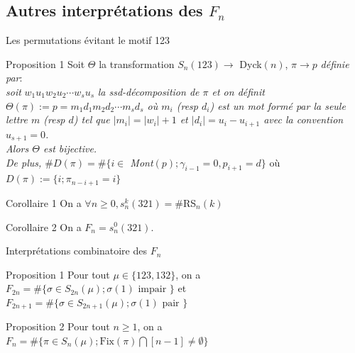 \subsection{Autres interprétations des $F_{n}$}
\begin{frame}{Les permutations évitant le motif 123}
    \transfade
    \begin{block}{Proposition 1}
        Soit $\Theta$ la transformation $S_{n}(123) \longrightarrow$ \rm{Dyck}$(n)$, $\pi \longrightarrow p$ \textit{définie par}:\\
        \textit{soit} $w_{1}u_{1}w_{2}u_2 \cdots w_{s}u_{s}$ \textit{la ssd-décomposition de $\pi$ et on définit $\Theta(\pi):=p=m_{1}d_{1}m_{2}d_{2}\cdots m_{s}d_{s}$ où $m_{i}$ (resp $d_{i}$) est un mot formé par la seule lettre $m$ (resp $d$) tel que $|m_{i}| = |w_{i}|+1$ et $|d_{i}| = u_{i}-u_{i+1}$ avec la convention $u_{s+1}=0$.}\\
        \textit{Alors $\Theta$ est bijective.}\\
        \textit{De plus, $\#D(\pi) = \#\{i\in$ \rm{Mont}$(p)$$;\gamma_{i-1}=0, p_{i+1}=d\}$} où $D(\pi):=\{i; \pi_{n-i+1}=i\}$
    \end{block}
    \pause
    \begin{block}{Corollaire 1}
        On a $\forall n \geq 0, s_{n}^{k}(321)=\#$\rm{RS}$_{n}(k)$
    \end{block}
    \pause
    \begin{block}{Corollaire 2}
        On a $F_{n} = s_{n}^{0}(321)$.
    \end{block}
\end{frame}

\begin{frame}{Interprétations combinatoire des $F_{n}$}
    \transfade
    \begin{block}{Proposition 1}
        Pour tout $\mu \in \{123, 132\}$, on a $F_{2n}=\#\{ \sigma \in S_{2n}(\mu); \sigma(1) \text{ impair }\}$ et $F_{2n+1} = \#\{\sigma\in S_{2n+1}(\mu); \sigma(1) \text{ pair }\}$
    \end{block}
    \pause
    \begin{block}{Proposition 2}
        Pour tout $n\geq 1$, on a $F_{n} = \#\{\pi \in S_{n}(\mu); \text{Fix}(\pi)\bigcap [n-1]\neq \emptyset\}$
    \end{block}
\end{frame}

